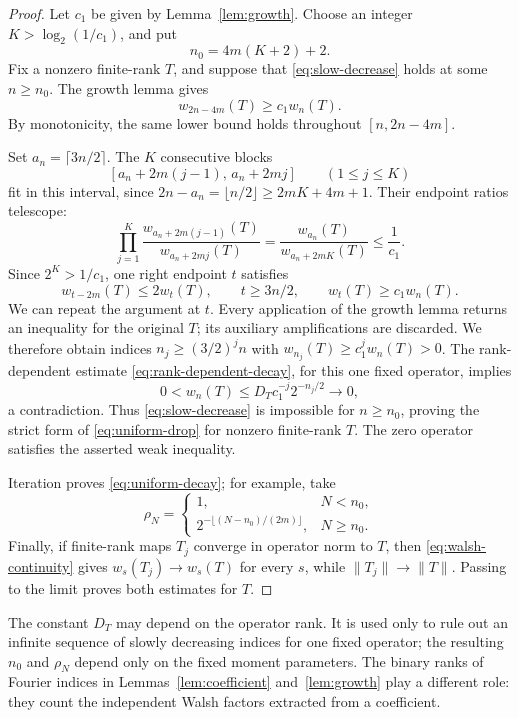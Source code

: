 \begin{proof}
Let \(c_1\) be given by Lemma~\ref{lem:growth}. Choose an integer
\(K>\log_2(1/c_1)\), and put
\[
n_0=4m(K+2)+2.
\]
Fix a nonzero finite-rank \(T\), and suppose that
\eqref{eq:slow-decrease} holds at some \(n\ge n_0\).
The growth lemma gives
\[
w_{2n-4m}(T)\ge c_1w_n(T).
\]
By monotonicity, the same lower bound holds throughout
\([n,2n-4m]\).

Set \(a_n=\lceil3n/2\rceil\). The \(K\) consecutive blocks
\[
[a_n+2m(j-1),\,a_n+2mj]\qquad(1\le j\le K)
\]
fit in this interval, since
\(2n-a_n=\lfloor n/2\rfloor\ge2mK+4m+1\).
Their endpoint ratios telescope:
\[
\prod_{j=1}^K
\frac{w_{a_n+2m(j-1)}(T)}{w_{a_n+2mj}(T)}
=\frac{w_{a_n}(T)}{w_{a_n+2mK}(T)}\le\frac1{c_1}.
\]
Since \(2^K>1/c_1\), one right endpoint \(t\) satisfies
\[
w_{t-2m}(T)\le2w_t(T),\qquad
t\ge3n/2,\qquad w_t(T)\ge c_1w_n(T).
\]
We can repeat the argument at \(t\).
Every application of the growth lemma returns an inequality for
the original \(T\); its auxiliary amplifications are discarded.
We therefore obtain indices \(n_j\ge(3/2)^j n\) with
\(w_{n_j}(T)\ge c_1^j w_n(T)>0\).
The rank-dependent estimate \eqref{eq:rank-dependent-decay}, for
this one fixed operator, implies
\[
0<w_n(T)\le D_Tc_1^{-j}2^{-n_j/2}\longrightarrow0,
\]
a contradiction.
Thus \eqref{eq:slow-decrease} is impossible for \(n\ge n_0\), proving
the strict form of \eqref{eq:uniform-drop} for nonzero finite-rank
\(T\). The zero operator satisfies the asserted weak inequality.

Iteration proves \eqref{eq:uniform-decay}; for example, take
\[
\rho_N=
\begin{cases}
1,&N<n_0,\\
2^{-\lfloor(N-n_0)/(2m)\rfloor},&N\ge n_0.
\end{cases}
\]
Finally, if finite-rank maps \(T_j\) converge in operator norm to
\(T\), then \eqref{eq:walsh-continuity} gives
\(w_s(T_j)\to w_s(T)\) for every \(s\), while
\(\|T_j\|\to\|T\|\). Passing to the limit proves both estimates
for \(T\).
\end{proof}

\begin{remark}
The constant \(D_T\) may depend on the operator rank. It is used only
to rule out an infinite sequence of slowly decreasing indices for
one fixed operator; the resulting \(n_0\) and \(\rho_N\) depend only
on the fixed moment parameters. The binary ranks of Fourier indices
in Lemmas~\ref{lem:coefficient} and~\ref{lem:growth} play a different role: they
count the independent Walsh factors extracted from a coefficient.
\end{remark}
